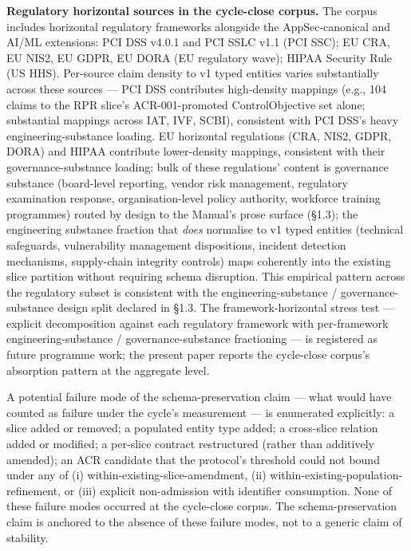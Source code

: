 \documentclass[
]{article}
\begin{document}
\textbf{Regulatory horizontal sources in the cycle-close corpus.} The
corpus includes horizontal regulatory frameworks alongside the
AppSec-canonical and AI/ML extensions: PCI DSS v4.0.1 and PCI SSLC v1.1
(PCI SSC); EU CRA, EU NIS2, EU GDPR, EU DORA (EU regulatory wave); HIPAA
Security Rule (US HHS). Per-source claim density to v1 typed entities
varies substantially across these sources --- PCI DSS contributes
high-density mappings (e.g., 104 claims to the RPR slice's
ACR-001-promoted ControlObjective set alone; substantial mappings across
IAT, IVF, SCBI), consistent with PCI DSS's heavy engineering-substance
loading. EU horizontal regulations (CRA, NIS2, GDPR, DORA) and HIPAA
contribute lower-density mappings, consistent with their
governance-substance loading: bulk of these regulations' content is
governance substance (board-level reporting, vendor risk management,
regulatory examination response, organisation-level policy authority,
workforce training programmes) routed by design to the Manual's prose
surface (§1.3); the engineering substance fraction that \emph{does}
normalise to v1 typed entities (technical safeguards, vulnerability
management dispositions, incident detection mechanisms, supply-chain
integrity controls) maps coherently into the existing slice partition
without requiring schema disruption. This empirical pattern across the
regulatory subset is consistent with the engineering-substance /
governance-substance design split declared in §1.3. The
framework-horizontal stress test --- explicit decomposition against each
regulatory framework with per-framework engineering-substance /
governance-substance fractioning --- is registered as future programme
work; the present paper reports the cycle-close corpus's absorption
pattern at the aggregate level.

A potential failure mode of the schema-preservation claim --- what would
have counted as failure under the cycle's measurement --- is enumerated
explicitly: a slice added or removed; a populated entity type added; a
cross-slice relation added or modified; a per-slice contract
restructured (rather than additively amended); an ACR candidate that the
protocol's threshold could not bound under any of (i)
within-existing-slice-amendment, (ii)
within-existing-population-refinement, or (iii) explicit non-admission
with identifier consumption. None of these failure modes occurred at the
cycle-close corpus. The schema-preservation claim is anchored to the
absence of these failure modes, not to a generic claim of stability.
\end{document}
